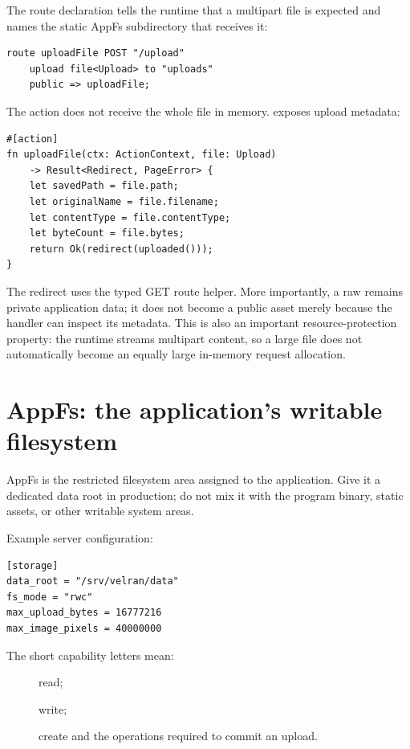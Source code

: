 The route declaration tells the runtime that a multipart file is expected and names the static AppFs subdirectory that receives it:

\begin{lstlisting}[language=Velran]
route uploadFile POST "/upload"
    upload file<Upload> to "uploads"
    public => uploadFile;
\end{lstlisting}

\newpage
The action does not receive the whole file in memory.  exposes upload metadata:

\begin{lstlisting}[language=Velran]
#[action]
fn uploadFile(ctx: ActionContext, file: Upload)
    -> Result<Redirect, PageError> {
    let savedPath = file.path;
    let originalName = file.filename;
    let contentType = file.contentType;
    let byteCount = file.bytes;
    return Ok(redirect(uploaded()));
}
\end{lstlisting}

The redirect uses the typed  GET route helper. More importantly, a raw  remains private application data; it does not become a public asset merely because the handler can inspect its metadata. This is also an important resource-protection property: the runtime streams multipart content, so a large file does not automatically become an equally large in-memory request allocation.

\section{AppFs: the application's writable filesystem}

AppFs is the restricted filesystem area assigned to the application. Give it a dedicated data root in production; do not mix it with the program binary, static assets, or other writable system areas.

Example server configuration:

\begin{lstlisting}
[storage]
data_root = "/srv/velran/data"
fs_mode = "rwc"
max_upload_bytes = 16777216
max_image_pixels = 40000000
\end{lstlisting}

The short capability letters mean:

\begin{description}
  \item[] read;
  \item[] write;
  \item[] create and the operations required to commit an upload.
\end{description}

